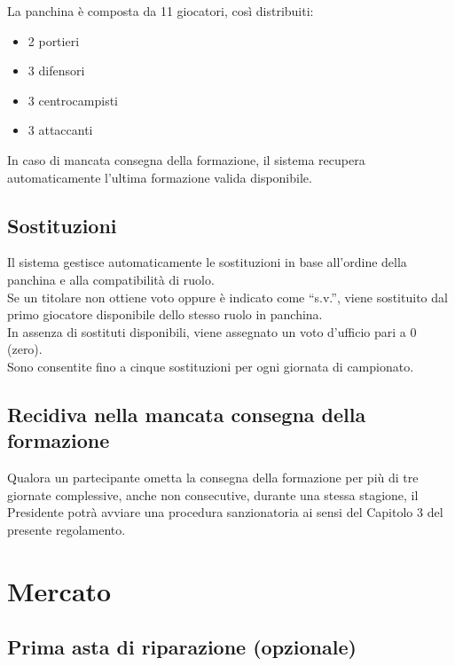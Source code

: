 \noindent
La panchina è composta da 11 giocatori, così distribuiti:

\begin{itemize}
  \item 2 portieri
  \item 3 difensori
  \item 3 centrocampisti
  \item 3 attaccanti
\end{itemize}

In caso di mancata consegna della formazione, il sistema recupera automaticamente l’ultima formazione valida disponibile.

\section{Sostituzioni}
\label{art:4.5}

Il sistema gestisce automaticamente le sostituzioni in base all’ordine della panchina e alla compatibilità di ruolo.\\
Se un titolare non ottiene voto oppure è indicato come “s.v.”, viene sostituito dal primo giocatore disponibile dello stesso ruolo in panchina.\\
In assenza di sostituti disponibili, viene assegnato un voto d’ufficio pari a 0 (zero).\\
Sono consentite fino a cinque sostituzioni per ogni giornata di campionato.

\section{Recidiva nella mancata consegna della formazione}
\label{art:4.6}

Qualora un partecipante ometta la consegna della formazione per più di tre giornate complessive, anche non consecutive, durante una stessa stagione, il Presidente potrà avviare una procedura sanzionatoria ai sensi del Capitolo 3 del presente regolamento.



\chapter{Mercato}
\label{cap:mercato}

\section{Prima asta di riparazione (opzionale)}
\label{art:5.1}

